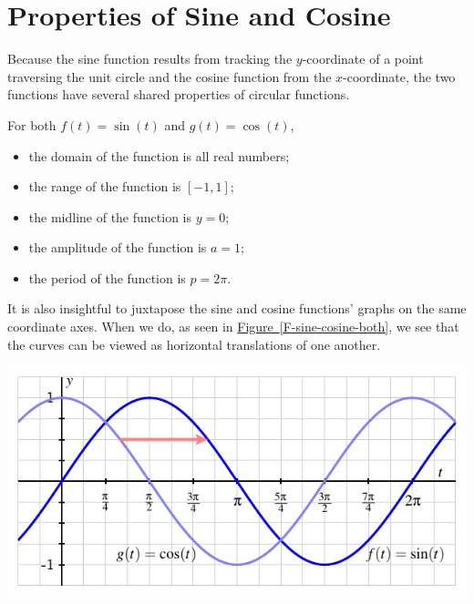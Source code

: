 \documentclass[nooutcomes]{ximera}
\begin{document}
\begin{center}  
\end{center} 


\section{Properties of Sine and Cosine}
Because the sine function results from tracking the \(y\)-coordinate of a point traversing the unit circle and the cosine function from the \(x\)-coordinate, the two functions have several shared properties of circular functions.

\begin{callout}
For both \(f(t) = \sin(t)\) and \(g(t) = \cos(t)\),%
\begin{itemize}[label=\textbullet]
\item
the domain of the function is all real numbers;%
\item
the range of the function is \([-1,1]\);%
\item
the midline of the function is \(y = 0\);%
\item
the amplitude of the function is \(a = 1\);%
\item
the period of the function is \(p = 2\pi\).%
\end{itemize}
\end{callout}

It is also insightful to juxtapose the sine and cosine functions' graphs on the same coordinate axes.  When we do, as seen in \hyperref[F-sine-cosine-both]{Figure~\ref{F-sine-cosine-both}}, we see that the curves can be viewed as horizontal translations of one another.%

\begin{image}
\includegraphics{sine-and-cosine-graphs.pdf}
\end{image}
\end{document}
